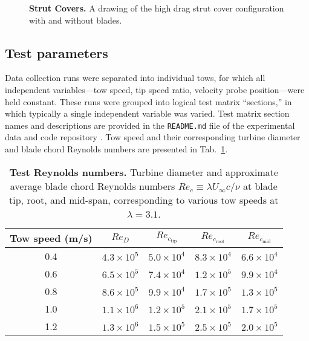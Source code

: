 \begin{figure}
    
    \caption{{\bf Strut Covers.} A drawing of the high drag strut cover
        configuration with and without blades.}
    
    \label{fig:covers}
\end{figure}


\subsection{Test parameters}

Data collection runs were separated into individual tows, for which all
independent variables---tow speed, tip speed ratio, velocity probe
position---were held constant. These runs were grouped into logical test matrix
``sections,'' in which typically a single independent variable was varied. Test
matrix section names and descriptions are provided in the \texttt{README.md}
file of the experimental data and code repository \cite{Bachant2016-RM2-data}.
Tow speed and their corresponding turbine diameter and blade chord Reynolds
numbers are presented in Tab.~\ref{tab:re}.

\begin{table}
    \centering
    \begin{tabular}{c|c|c|c|c}
        Tow speed (m/s) & $Re_D$ & $Re_{c_\mathrm{tip}}$ & $Re_{c_\mathrm{root}}$ & $Re_{c_\mathrm{mid}}$\\
        \hline
        0.4 & $4.3 \times 10^5$ & $5.0 \times 10^4$ & $8.3 \times 10^4$ & $6.6 \times 10^4$ \\
        0.6 & $6.5 \times 10^5$ & $7.4 \times 10^4$ & $1.2 \times 10^5$ & $9.9 \times 10^4$ \\
        0.8 & $8.6 \times 10^5$ & $9.9 \times 10^4$ & $1.7 \times 10^5$ & $1.3 \times 10^5$ \\
        1.0 & $1.1 \times 10^6$ & $1.2 \times 10^5$ & $2.1 \times 10^5$ & $1.7 \times 10^5$ \\
        1.2 & $1.3 \times 10^6$ & $1.5 \times 10^5$ & $2.5 \times 10^5$ & $2.0 \times 10^5$ \\
    \end{tabular}
    
    \caption{{\bf Test Reynolds numbers.} Turbine diameter and approximate average
        blade chord Reynolds numbers $Re_c \equiv \lambda U_\infty c / \nu$ at blade
        tip, root, and mid-span, corresponding to various tow speeds at $\lambda=3.1$.}
    
    \label{tab:re}
\end{table}

